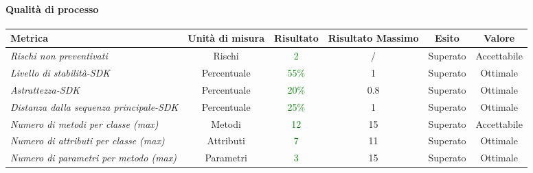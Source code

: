 \paragraph{Qualità di processo}
\begin{longtable}{|>{\centering}m{5cm}|c|c|c|c|c|}
\hline
\textbf{Metrica} & \textbf{Unità di misura} & \textbf{Risultato} & \textbf{Risultato Massimo} & \textbf{Esito} & \textbf{Valore}\\
\hline
\endhead

\emph{Rischi non preventivati} & {Rischi} & \textcolor{Green}{2} & / & Superato & Accettabile\\ \hline
\emph{Livello di stabilità-SDK} & {Percentuale} &\textcolor{Green}{55\%} & 1 & Superato & Ottimale\\ \hline
\emph{Astrattezza-SDK} & {Percentuale} & \textcolor{Green}{20\%} & 0.8 & Superato & Ottimale\\ \hline
\emph{Distanza dalla sequenza principale-SDK} & {Percentuale} &\textcolor{Green}{25\%} & 1 & Superato & Ottimale\\ \hline
\emph{Numero di metodi per classe (max)} & {Metodi} & \textcolor{Green}{12} & 15 & Superato & Accettabile\\ \hline
\emph{Numero di attributi per classe (max)} & {Attributi} & \textcolor{Green}{7} & 11 & Superato & Ottimale\\ \hline
\emph{Numero di parametri per metodo (max)} & {Parametri} & \textcolor{Green}{3} & 15 & Superato & Ottimale\\ \hline

\end{longtable}
